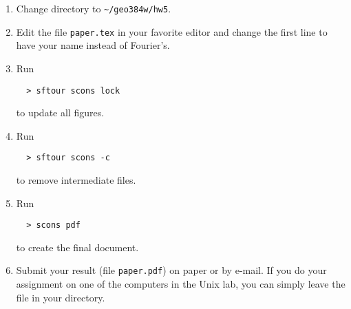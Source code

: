 \begin{enumerate}
\item Change directory to \verb#~/geo384w/hw5#.
\item Edit the file \texttt{paper.tex} in your favorite editor and change the
  first line to have your name instead of Fourier's.
\item Run
\begin{verbatim}
  > sftour scons lock
\end{verbatim}
to update all figures.
\item Run
\begin{verbatim}
  > sftour scons -c
\end{verbatim}
  to remove intermediate files.
\item Run
 \begin{verbatim} 
  > scons pdf
\end{verbatim}
  to create the final document.
\item Submit your result (file \texttt{paper.pdf}) on paper or by
  e-mail. If you do your assignment on one of the computers in the
  Unix lab, you can simply leave the file in your directory.
\end{enumerate}
